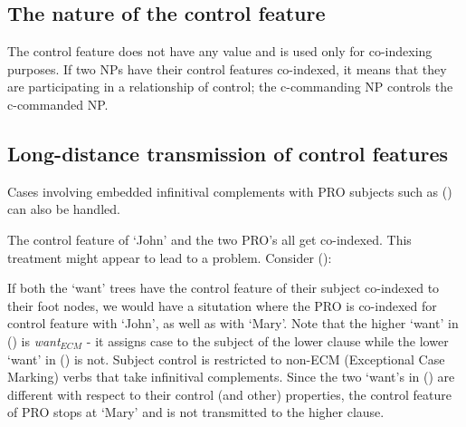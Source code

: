 \subsection{The nature of the control feature}
The control feature does not have any value and is used only for
co-indexing purposes. If two NPs have their control features
co-indexed, it means that they are participating in a relationship
of control; the c-commanding NP controls the c-commanded NP. 

\subsection{Long-distance transmission of control features}
Cases involving embedded infinitival complements with PRO subjects such as
() can also be handled.


The control feature of `John' and the two PRO's all get co-indexed.
This treatment might appear to lead to a problem. Consider ():


If both the `want' trees have the control feature of their subject
co-indexed to their foot nodes, we would have a situtation where
the PRO is co-indexed for control feature with `John', as well as with `Mary'. 
Note that the higher `want' in () is {\em want$_{ECM}$} 
- it assigns case
to the subject of the lower clause while the lower `want' in () is 
not. Subject control is restricted
to non-ECM (Exceptional Case Marking) verbs that take infinitival 
complements. Since the two `want's in () are different with
respect to their control (and other) properties, the control feature
of PRO stops at `Mary' and is not transmitted to the higher clause.


